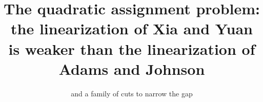 %
\newcommand{\Rbb}{\ensuremath{\mathds{R}}}
\newcommand{\set}[1]{\ensuremath{\left\{#1\right\}}}
\newcommand{\setval}[2]{\set{#1, \ldots, #2}}
\newcommand{\cf}{cf.\xspace}%
\newcommand{\eg}{e.\,g.\xspace}%
\newcommand{\Nbb}{\ensuremath{\mathds{N}}}
\newcommand{\Ocal}{\ensuremath{\mathcal{O}}}
\newcommand{\ie}{i.\,e.\xspace}%
\DeclareMathOperator{\Proj}{Proj}
\DeclareMathOperator{\argmin}{argmin}

%
%


\title{The quadratic assignment problem: the linearization of Xia and Yuan is weaker than the linearization of Adams and Johnson
}
\subtitle{and a family of cuts to narrow the gap}


